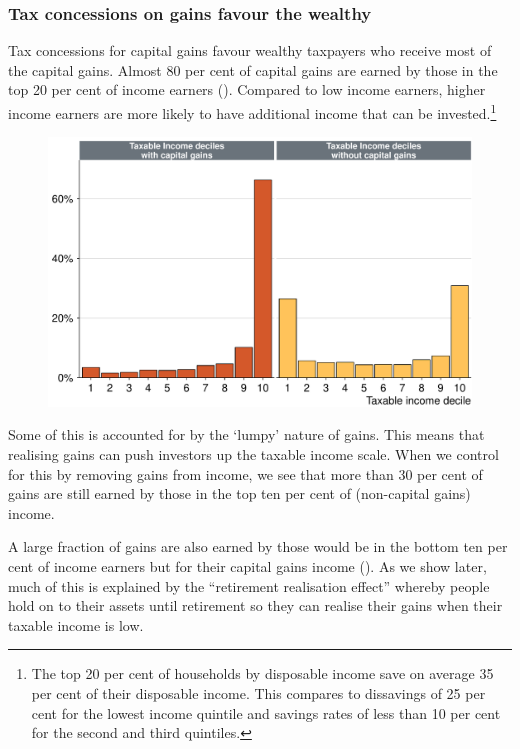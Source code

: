 \documentclass{grattan}\usepackage[]{graphicx}\usepackage[]{color}
\newcommand\gao{Grattan analysis of}
\begin{document}
\subsubsection{Tax concessions on gains favour the wealthy}
Tax concessions for capital gains favour wealthy taxpayers who receive most of the capital gains. Almost 80 per cent of capital gains are earned by those in the top 20 per cent of income earners (). Compared to low income earners, higher income earners are more likely to have additional income that can be invested.\footnote{The top 20 per cent of households by disposable income save on average 35 per cent of their disposable income. This compares to dissavings of 25 per cent for the lowest income quintile and savings rates of less than 10 per cent for the second and third quintiles.}


\begin{figure}
\includegraphics[width=\columnwidth]{figure/Nearly_eighty_per_cent_of_capital_gains_are_earned_by_those_-1}
\source{\gao\ \textcite{ATO2013i}}
\end{figure}
Some of this is accounted for by the `lumpy' nature of gains. This means that realising gains can push investors up the taxable income scale. When we control for this by removing gains from income, we see that more than 30 per cent of gains are still earned by those in the top ten per cent of (non-capital gains) income. 

A large fraction of gains are also earned by those would be in the bottom ten per cent of income earners but for their capital gains income (). As we show later, much of this is explained by the ``retirement realisation effect'' whereby people hold on to their assets until retirement so they can realise their gains when their taxable income is low. 
\end{document}
